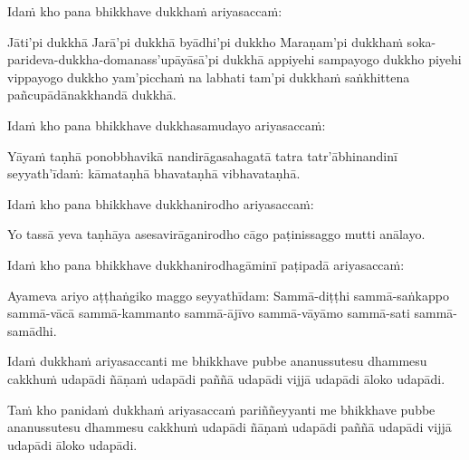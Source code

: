 \begin{pali-hang}
  Idaṁ kho pana bhikkhave dukkhaṁ ariyasaccaṁ:
\end{pali-hang}

\begin{pali-hang}
  Jāti'pi dukkhā Jarā'pi dukkhā byādhi'pi dukkho Maraṇam'pi dukkhaṁ soka-parideva-dukkha-domanass'upāyāsā'pi dukkhā appiyehi sampayogo dukkho piyehi vippayogo dukkho yam'picchaṁ na labhati tam'pi dukkhaṁ saṅkhittena pañcupādānakkhandā dukkhā.
\end{pali-hang}

\begin{pali-hang}
  Idaṁ kho pana bhikkhave dukkhasamudayo ariyasaccaṁ:
\end{pali-hang}

\begin{pali-hang}
  Yāyaṁ taṇhā ponobbhavikā nandirāgasahagatā tatra tatr'ābhinandinī seyyath'īdaṁ: kāmataṇhā bhavataṇhā vibhavataṇhā.
\end{pali-hang}

\begin{pali-hang}
  Idaṁ kho pana bhikkhave dukkhanirodho ariyasaccaṁ:
\end{pali-hang}

\begin{pali-hang}
  Yo tassā yeva taṇhāya asesavirāganirodho cāgo paṭinissaggo mutti anālayo.
\end{pali-hang}

\begin{pali-hang}
  Idaṁ kho pana bhikkhave dukkhanirodhagāminī paṭipadā ariyasaccaṁ:
\end{pali-hang}

\begin{pali-hang}
  Ayameva ariyo aṭṭhaṅgiko maggo seyyathīdam: Sammā-diṭṭhi sammā-saṅkappo sammā-vācā sammā-kammanto sammā-ājīvo sammā-vāyāmo sammā-sati sammā-samādhi.
\end{pali-hang}

\begin{pali-hang}
  Idaṁ dukkhaṁ ariyasaccanti me bhikkhave pubbe ananussutesu dhammesu cakkhuṁ udapādi ñāṇaṁ udapādi paññā udapādi vijjā udapādi āloko udapādi.
\end{pali-hang}

\begin{pali-hang}
  Taṁ kho panidaṁ dukkhaṁ ariyasaccaṁ pariññeyyanti me bhikkhave pubbe ananussutesu dhammesu cakkhuṁ udapādi ñāṇaṁ udapādi paññā udapādi vijjā udapādi āloko udapādi.
\end{pali-hang}

